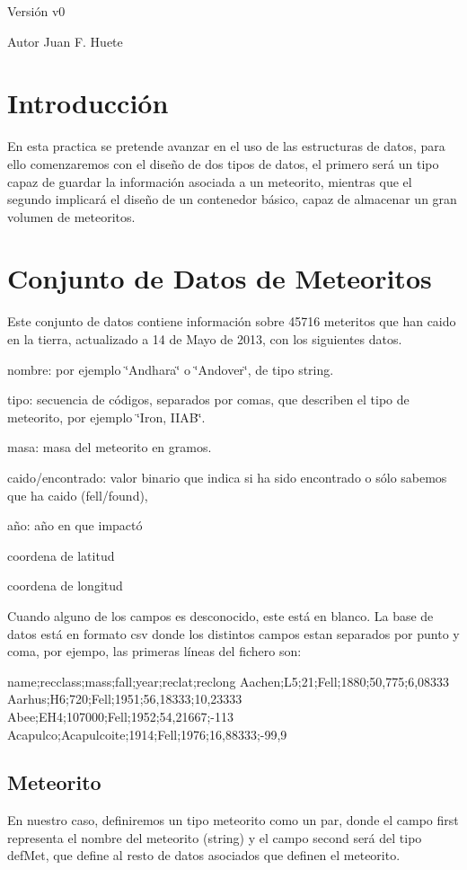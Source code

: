 \begin{DoxyVersion}{\-Versión}
v0 
\end{DoxyVersion}
\begin{DoxyAuthor}{\-Autor}
\-Juan \-F. \-Huete
\end{DoxyAuthor}
\hypertarget{index_intro_sec}{}\section{\-Introducción}\label{index_intro_sec}
\-En esta practica se pretende avanzar en el uso de las estructuras de datos, para ello comenzaremos con el diseño de dos tipos de datos, el primero será un tipo capaz de guardar la información asociada a un meteorito, mientras que el segundo implicará el diseño de un contenedor básico, capaz de almacenar un gran volumen de meteoritos.\hypertarget{index_meteorito}{}\section{\-Conjunto de Datos de Meteoritos}\label{index_meteorito}
\-Este conjunto de datos contiene información sobre 45716 meteritos que han caido en la tierra, actualizado a 14 de \-Mayo de 2013, con los siguientes datos.

\begin{DoxyItemize}
\item nombre\-: por ejemplo \char`\"{}\-Andhara\char`\"{} o \char`\"{}\-Andover\char`\"{}, de tipo string. \item tipo\-: secuencia de códigos, separados por comas, que describen el tipo de meteorito, por ejemplo \char`\"{}\-Iron, I\-I\-A\-B\char`\"{}. \item masa\-: masa del meteorito en gramos. \item caido/encontrado\-: valor binario que indica si ha sido encontrado o sólo sabemos que ha caido (fell/found), \item año\-: año en que impactó \item coordena de latitud \item coordena de longitud\end{DoxyItemize}
\-Cuando alguno de los campos es desconocido, este está en blanco. \-La base de datos está en formato csv donde los distintos campos estan separados por punto y coma, por ejempo, las primeras líneas del fichero son\-:


\begin{DoxyCode}
name;recclass;mass;fall;year;reclat;reclong
Aachen;L5;21;Fell;1880;50,775;6,08333
Aarhus;H6;720;Fell;1951;56,18333;10,23333
Abee;EH4;107000;Fell;1952;54,21667;-113
Acapulco;Acapulcoite;1914;Fell;1976;16,88333;-99,9
\end{DoxyCode}
\hypertarget{index_met}{}\subsection{\-Meteorito}\label{index_met}
\-En nuestro caso, definiremos un tipo meteorito como un par, donde el campo first representa el nombre del meteorito (string) y el campo second será del tipo def\-Met, que define al resto de datos asociados que definen el meteorito.



